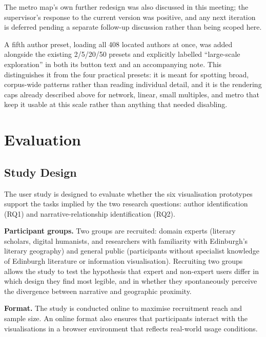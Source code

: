 \documentclass[logo,msc]{infthesis}
\begin{document}
The metro map's own further redesign was also discussed in this meeting; the supervisor's response to the current version was positive, and any next iteration is deferred pending a separate follow-up discussion rather than being scoped here.

A fifth author preset, loading all 408 located authors at once, was added alongside the existing 2/5/20/50 presets and explicitly labelled ``large-scale exploration'' in both its button text and an accompanying note. This distinguishes it from the four practical presets: it is meant for spotting broad, corpus-wide patterns rather than reading individual detail, and it is the rendering caps already described above for network, linear, small multiples, and metro that keep it usable at this scale rather than anything that needed disabling.

 
 
\chapter{Evaluation}
\label{chap:eval}
 
\section{Study Design}
 
The user study is designed to evaluate whether the six visualisation prototypes support the tasks implied by the two research questions: author identification (RQ1) and narrative-relationship identification (RQ2).
 
\textbf{Participant groups.} Two groups are recruited: domain experts (literary scholars, digital humanists, and researchers with familiarity with Edinburgh's literary geography) and general public (participants without specialist knowledge of Edinburgh literature or information visualisation). Recruiting two groups allows the study to test the hypothesis that expert and non-expert users differ in which design they find most legible, and in whether they spontaneously perceive the divergence between narrative and geographic proximity.
 
\textbf{Format.} The study is conducted online to maximise recruitment reach and sample size. An online format also ensures that participants interact with the visualisations in a browser environment that reflects real-world usage conditions.
 
\end{document}

